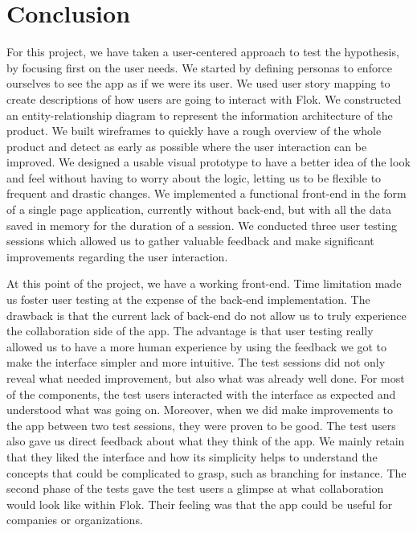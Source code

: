 \documentclass[a4paper,12pt,twoside]{article}
\begin{document}
\FloatBarrier
\section{Conclusion}

For this project, we have taken a user-centered approach to test the hypothesis, by focusing first on the user needs.
We started by defining personas to enforce ourselves to see the app as if we were its user.
We used user story mapping to create descriptions of how users are going to interact with Flok.
We constructed an entity-relationship diagram to represent the information architecture of the product.
We built wireframes to quickly have a rough overview of the whole product and detect as early as possible where the user interaction can be improved.
We designed a usable visual prototype to have a better idea of the look and feel without having to worry about the logic, letting us to be flexible to frequent and drastic changes.
We implemented a functional front-end in the form of a single page application, currently without back-end, but with all the data saved in memory for the duration of a session.
We conducted three user testing sessions which allowed us to gather valuable feedback and make significant improvements regarding the user interaction.

At this point of the project, we have a working front-end.
Time limitation made us foster user testing at the expense of the back-end implementation.
The drawback is that the current lack of back-end do not allow us to truly experience the collaboration side of the app.
The advantage is that user testing really allowed us to have a more human experience by using the feedback we got to make the interface simpler and more intuitive.
The test sessions did not only reveal what needed improvement, but also what was already well done.
For most of the components, the test users interacted with the interface as expected and understood what was going on.
Moreover, when we did make improvements to the app between two test sessions, they were proven to be good.
The test users also gave us direct feedback about what they think of the app.
We mainly retain that they liked the interface and how its simplicity helps to understand the concepts that could be complicated to grasp, such as branching for instance.
The second phase of the tests gave the test users a glimpse at what collaboration would look like within Flok.
Their feeling was that the app could be useful for companies or organizations.
\end{document}
